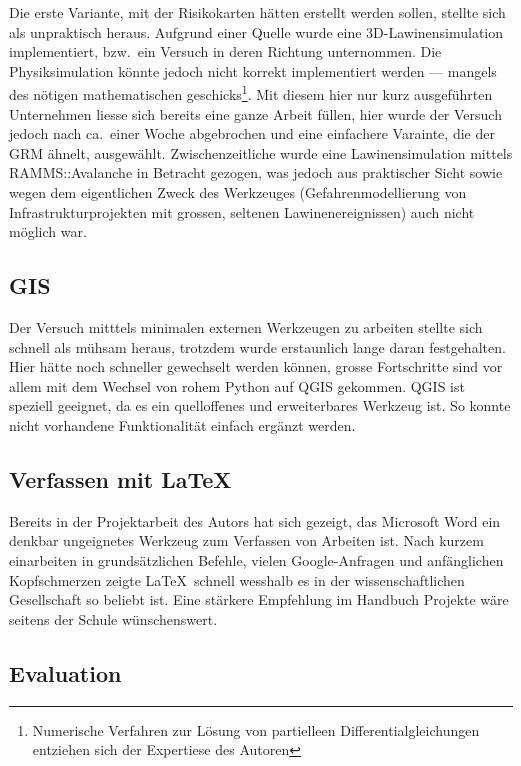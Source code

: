 Die erste Variante, mit der Risikokarten hätten erstellt werden sollen, stellte sich als unpraktisch heraus. Aufgrund einer Quelle wurde eine 3D-Lawinensimulation implementiert, bzw.\ ein Versuch in deren Richtung unternommen. Die Physiksimulation könnte jedoch nicht korrekt implementiert werden --- mangels des nötigen mathematischen geschicks\footnote{Numerische Verfahren zur Lösung von partielleen Differentialgleichungen entziehen sich der Expertiese des Autoren}. Mit diesem hier nur kurz ausgeführten Unternehmen liesse sich bereits eine ganze Arbeit füllen, hier wurde der Versuch jedoch nach ca.\ einer Woche abgebrochen und eine einfachere Varainte, die der GRM ähnelt, ausgewählt. Zwischenzeitliche wurde eine Lawinensimulation mittels RAMMS::Avalanche in Betracht gezogen, was jedoch aus praktischer Sicht sowie wegen dem eigentlichen Zweck des Werkzeuges (Gefahrenmodellierung von Infrastrukturprojekten mit grossen, seltenen Lawinenereignissen) auch nicht möglich war.

\subsection{GIS}

Der Versuch mitttels minimalen externen Werkzeugen zu arbeiten stellte sich schnell als mühsam heraus, trotzdem wurde erstaunlich lange daran festgehalten. Hier hätte noch schneller gewechselt werden können, grosse Fortschritte sind vor allem mit dem Wechsel von rohem Python auf QGIS gekommen. QGIS ist speziell geeignet, da es ein quelloffenes und erweiterbares Werkzeug ist. So konnte nicht vorhandene Funktionalität einfach ergänzt werden.

\subsection{Verfassen mit \LaTeX}
Bereits in der Projektarbeit des Autors hat sich gezeigt, das Microsoft Word ein denkbar ungeignetes Werkzeug zum Verfassen von Arbeiten ist. Nach kurzem einarbeiten in grundsätzlichen Befehle, vielen Google-Anfragen und anfänglichen Kopfschmerzen zeigte \LaTeX\ schnell wesshalb es in der wissenschaftlichen Gesellschaft so beliebt ist. Eine stärkere Empfehlung im Handbuch Projekte wäre seitens der Schule wünschenswert.

\subsection{Evaluation}

